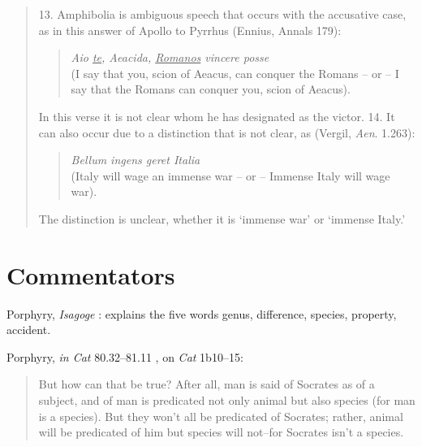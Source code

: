 \documentclass{article}
\begin{document}
\begin{quote}
13. Amphibolia is ambiguous speech that occurs with the accusative case, as in this answer of Apollo to Pyrrhus (Ennius, Annals 179):
\begin{quote}
{\em Aio \underline{te}, Aeacida, \underline{Romanos} vincere posse}\\
(I say that you, scion of Aeacus, can conquer the Romans -- or -- I say that the Romans can conquer you, scion of Aeacus).
\end{quote}
In this verse it is not clear whom he has designated as the victor. 14. It can also occur due to a distinction that is not clear, as (Vergil, {\em Aen}. 1.263):
\begin{quote}
{\em Bellum ingens geret Italia}\\
(Italy will wage an immense war -- or -- Immense Italy will wage war).
\end{quote}
The distinction is unclear, whether it is `immense war' or `immense Italy.'
\end{quote}

















\section{Commentators}
Porphyry, {\em Isagoge} \cite{isagoge}: explains the five words genus, difference, species, property, accident.

Porphyry, {\em in Cat} 80.32--81.11 \cite[p.~145]{barnes}, on {\em Cat} 1b10--15:

\begin{quote}
But how can that be true? After all, man is said of Socrates as of a subject, and of man is predicated not only animal but also species (for man is a species). But they won't all be predicated of Socrates; rather, animal will be predicated of him but species will not--for Socrates isn't a species.
\end{quote}
\end{document}
